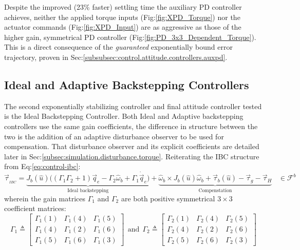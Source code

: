 Despite the improved (23\% faster) settling time the auxiliary PD controller achieves, neither the applied torque inputs (Fig:\ref{fig:XPD_Torque}) nor the actuator commands (Fig:\ref{fig:XPD_Input}) are as aggressive as those of the higher gain, symmetrical PD controller (Fig:\ref{fig:PD_3x3_Dependent_Torque}). This is a direct consequence of the \emph{guaranteed} exponentially bound error trajectory, proven in Sec:\ref{subsubsec:control.attitude.controllers.auxpd}.
\subsection{Ideal and Adaptive Backstepping Controllers}
The second exponentially stabilizing controller and final attitude controller tested is the Ideal Backstepping Controller. Both Ideal and Adaptive backstepping controllers use the same gain coefficients, the difference in structure between the two is the addition of an adaptive disturbance observer to be used for compensation. That disturbance observer and its explicit coefficients are detailed later in Sec:\ref{subsec:simulation.disturbance.torque}. Reiterating the IBC structure from Eq:\ref{eq:control-ibc}:
\begin{equation}\label{eq:simulation-attitude-ibc}
\vec{\tau}_{_{IBC}}=\underbrace{J_b(\hat{u})\Big((\Gamma_1\Gamma_2+1)\vec{q}_e-\Gamma_2\hat{\omega}_b+\Gamma_1\dot{\vec{q}}_e \Big)}_{\text{Ideal backstepping}}
+\underbrace{\hat{\omega}_b\times J_b(\hat{u})\hat{\omega}_b+\vec{\tau}_b(\hat{u})-\vec{\tau}_g-\vec{\tau}_H}_{\text{Compenstation}}~~~~\in\mathcal{F}^{b}
\end{equation}
wherein the gain matrices $\Gamma_1$ and $\Gamma_2$ are both positive symmetrical $3\times 3$ coefficient matrices:
\begin{equation}\label{eq:simulation-attitde-ibc-coefficients}
\Gamma_1\triangleq \begin{bmatrix}
\Gamma_1(1) & \Gamma_1(4) & \Gamma_1(5)\\
\Gamma_1(4) & \Gamma_1(2) & \Gamma_1(6)\\
\Gamma_1(5) & \Gamma_1(6) & \Gamma_1(3)
\end{bmatrix}
~~\text{and}~~
\Gamma_2\triangleq \begin{bmatrix}
\Gamma_2(1) & \Gamma_2(4) & \Gamma_2(5)\\
\Gamma_2(4) & \Gamma_2(2) & \Gamma_2(6)\\
\Gamma_2(5) & \Gamma_2(6) & \Gamma_2(3)
\end{bmatrix}
\end{equation}

